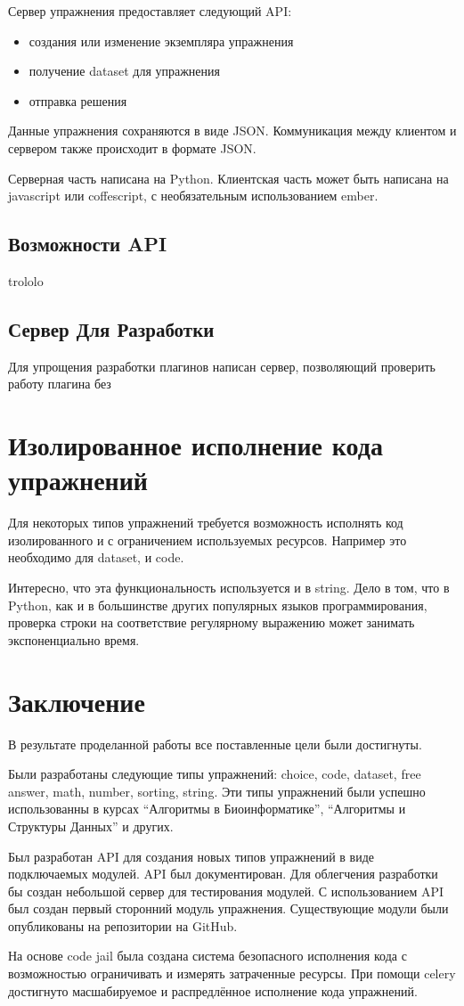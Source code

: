\documentclass{matmex-diploma-custom}
\begin{document}
Сервер упражнения предоставляет следующий API:

\begin{itemize}
\item создания или изменение экземпляра упражнения
\item получение dataset для упражнения
\item отправка решения
\end{itemize}

Данные упражнения сохраняются в виде JSON. Коммуникация между клиентом
и сервером также происходит в формате JSON.

Серверная часть написана на Python.
Клиентская часть может быть написана на javascript или coffescript,
с необязательным использованием ember.

\subsection*{Возможности API}
trololo

\subsection*{Сервер Для Разработки}
Для упрощения разработки плагинов написан сервер, позволяющий проверить
работу плагина без

\section{Изолированное исполнение кода упражнений}
Для некоторых типов упражнений требуется возможность исполнять код
изолированного и с ограничением используемых ресурсов. Например это
необходимо для dataset, и code.

Интересно, что эта функциональность
используется и в string. Дело в том, что в Python, как и в большинстве
других популярных языков программирования, проверка строки на
соответствие регулярному выражению может занимать экспоненциально время.

\section*{Заключение}
В результате проделанной работы все поставленные цели были
достигнуты.

Были разработаны следующие типы упражнений: choice, code, dataset,
free answer, math, number, sorting, string. Эти типы упражнений были
успешно использованны в курсах ``Алгоритмы в Биоинформатике'',
``Алгоритмы и Структуры Данных'' и других.

Был разработан API для создания новых типов упражнений в виде
подключаемых модулей. API был документирован. Для облегчения
разработки бы создан небольшой сервер для тестирования модулей. С
использованием API был создан первый сторонний модуль
упражнения. Существующие модули были опубликованы на репозитории на
GitHub.

На основе code jail была создана система безопасного исполнения кода с
возможностью ограничивать и измерять затраченные ресурсы. При помощи
celery достигнуто масшабируемое и распредлённое исполнение кода упражнений.



\end{document}
